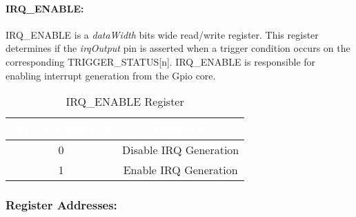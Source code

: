 \newpage
\paragraph{IRQ\_ENABLE:}
IRQ\_ENABLE is a \textit{dataWidth} bits wide read/write register. This register determines if the \textit{irqOutput} pin is asserted when a trigger condition
occurs on the corresponding TRIGGER\_STATUS[n]. IRQ\_ENABLE is responsible for enabling interrupt generation from the Gpio core.
\begin{table}[h]
  \centering
  \begin{tabular}{|c|c|}
      \hline
      \rowcolor{dark-gray}  %
      \textcolor{white}{\textbf{IRQ\_ENABLE[n]}} & \textcolor{white}{\textbf{Definition}} \\ \hline
      0 & Disable IRQ Generation\\ \hline
      1 & Enable IRQ Generation \\ \hline
  \end{tabular}
  \caption{IRQ\_ENABLE Register}
\end{table}

\newpage

\subsubsection{Register Addresses:}
